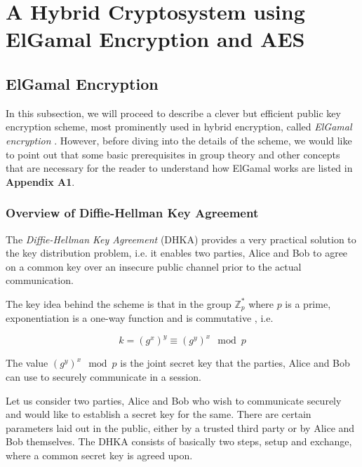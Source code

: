 \section{A Hybrid Cryptosystem using ElGamal Encryption and AES}

\label{sec:elgamal} 

\subsection{ElGamal Encryption}
In this subsection, we will proceed to describe a clever but efficient public key encryption scheme, most prominently used in hybrid encryption, called \textit{ElGamal encryption} \textsuperscript{\cite{Elgamal_1985}}. 
However, before diving into the details of the scheme, we would like to point out that some basic prerequisites in group theory and other concepts that are necessary for the reader to understand how ElGamal works are listed in \textbf{Appendix A1}.

\subsubsection{Overview of Diffie-Hellman Key Agreement}

\label{subsec:dhka} 

The \emph{Diffie-Hellman Key Agreement} (DHKA) provides a very practical solution to the key distribution problem, i.e. it enables two parties, Alice and Bob to agree on a common key over an insecure public channel prior to the actual communication.

The key idea behind the scheme is that in the group \( \mathbb{Z}^*_p \) where \( p \) is a prime, exponentiation is a one-way function and is commutative \cite{paar2009understanding}, i.e.

\begin{equation}
    k = (g^x)^y \equiv (g^y)^x \mod p
\end{equation}

The value \( (g^y)^x \mod p \) is the joint secret key that the parties, Alice and Bob can use to securely communicate in a session.

Let us consider two parties, Alice and Bob who wish to communicate securely and would like to establish a secret key for the same. 
There are certain parameters laid out in the public, either by a trusted third party or by Alice and Bob themselves. 
The DHKA consists of basically two steps, setup and exchange, where a common secret key is agreed upon.

